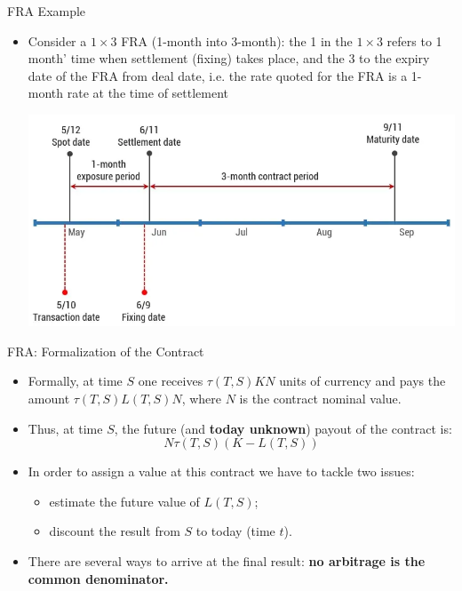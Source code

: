\documentclass{beamer}
\begin{document}
\begin{frame}{FRA Example}
	\begin{itemize}
		\item Consider a $1\times 3$ FRA (1-month into 3-month): the 1 in the $1\times 3$ refers to 1 month' time when settlement (fixing) takes place, and the 3 to the expiry date of the FRA from deal date, i.e. the rate quoted for the FRA is a 1-month rate at the time of settlement
	\begin{center}
		\includegraphics[width=0.8\linewidth]{fra_timeline}
	\end{center}
\end{itemize}
\end{frame}

\begin{frame}{FRA: Formalization of the Contract}
	\begin{itemize}
		\item<1-> Formally, at time $S$ one receives $\tau(T, S)KN$ units of currency and pays the amount $\tau(T,S)L(T,S)N$, where $N$ is the contract nominal value.
		\item<2-> Thus, at time $S$, the future (and \textbf{today unknown}) payout of the contract is: 
		\begin{equation}
			N\tau(T,S)(K-L(T,S))
			\label{eq:fra_payoff}
		\end{equation}
		\item<3-> In order to assign a value at this contract we have to tackle two issues:
		\begin{itemize}
			\item<4-> estimate the future value of $L(T, S)$;
			\item<5-> discount the result from $S$ to today (time $t$).
		\end{itemize}
		\item<6-> There are several ways to arrive at the final result: \textbf{no arbitrage is the common denominator.}
	\end{itemize}
\end{frame}
\end{document}
